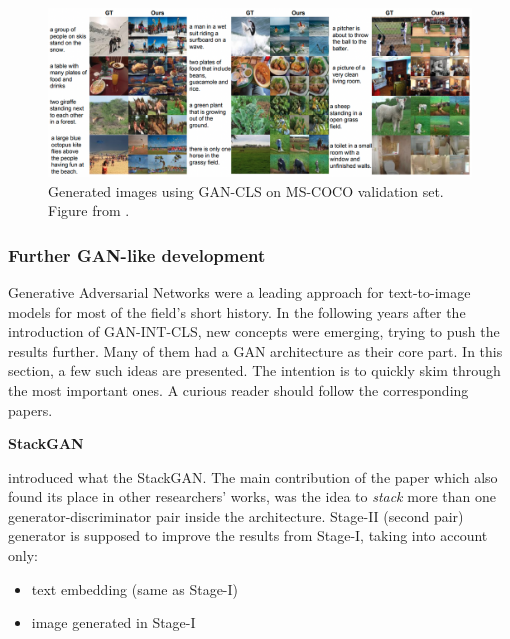 \documentclass[
]{krantz}
\providecommand{\tightlist}{%
  \setlength{\itemsep}{0pt}\setlength{\parskip}{0pt}}
\begin{document}
\begin{figure}

{\centering \includegraphics[width=1\linewidth]{figures/02-02-text-2-img/ganclsmscoco} 

}

\caption{Generated images using GAN-CLS on MS-COCO validation set. Figure from \citet{GANTextToImage2016}.}\label{fig:ganclsmscoco}
\end{figure}



\hypertarget{further-gan-like-development}{%
\subsubsection{Further GAN-like development}\label{further-gan-like-development}}

Generative Adversarial Networks were a leading approach for text-to-image models for most of the field's short history. In the following years after the introduction of GAN-INT-CLS, new concepts were emerging, trying to push the results further. Many of them had a GAN architecture as their core part. In this section, a few such ideas are presented. The intention is to quickly skim through the most important ones. A curious reader should follow the corresponding papers.

\textbf{StackGAN}

\citet{StackGAN2016} introduced what the StackGAN. The main contribution of the paper which also found its place in other researchers' works, was the idea to \emph{stack} more than one generator-discriminator pair inside the architecture. Stage-II (second pair) generator is supposed to improve the results from Stage-I, taking into account only:

\begin{itemize}
\tightlist
\item
  text embedding (same as Stage-I)
\item
  image generated in Stage-I
\end{itemize}
\end{document}

